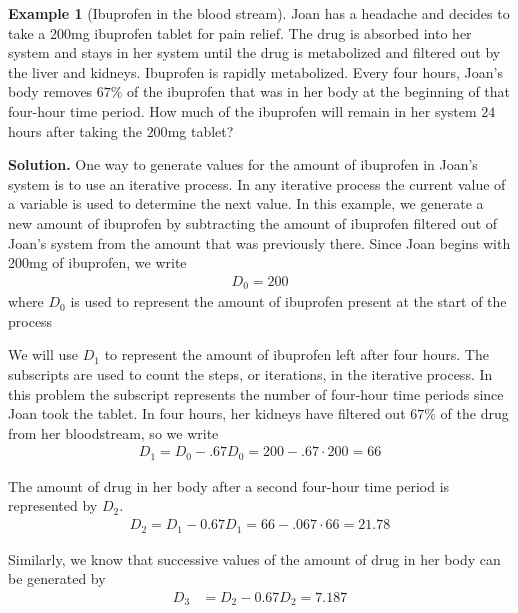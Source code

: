 \documentclass[10pt,]{book}
\theoremstyle{plain}
\theoremstyle{definition}
\theoremstyle{definition}
\newtheorem{example}[theorem]{Example}
\theoremstyle{definition}
\numberwithin{equation}{section}
\newcommand{\amp}{&}
\begin{document}
\begin{example}[Ibuprofen in the blood stream]\label{ibuprofen-example-one-dose}
\hypertarget{p-6}{}%
Joan has a headache and decides to take a 200mg ibuprofen tablet for pain relief.  The drug is absorbed into her system and stays in her system until the drug is metabolized and filtered out by the liver and kidneys.  Ibuprofen is rapidly metabolized.  Every four hours, Joan's body removes \(67\%\) of the ibuprofen that was in her body at the beginning of that four-hour time period.  How much of the ibuprofen will remain in her system \(24\) hours after taking the \(200\)mg tablet?%
\par\smallskip%
\noindent\textbf{Solution.}\hypertarget{solution-1}{}\quad%
\hypertarget{p-7}{}%
One way to generate values for the amount of ibuprofen in Joan's system is to use an iterative process.  In any iterative process the current value of a variable is used to determine the next value.  In this example, we generate a new amount of ibuprofen by subtracting the amount of ibuprofen filtered out of Joan's system from the amount that was previously there.  Since Joan begins with 200mg of ibuprofen, we write%
\begin{gather*}
D_0 = 200
\end{gather*}
where \(D_0\) is used to represent the amount of ibuprofen present at the start of the process%
\par
\hypertarget{p-8}{}%
We will use \(D_1\) to represent the amount of ibuprofen left after four hours.  The subscripts are used to count the steps, or iterations,  in the iterative process. In this problem the subscript  represents the number of four-hour time periods since Joan took the tablet.  In four hours, her kidneys have filtered out \(67\%\) of the drug from her bloodstream, so we write%
\begin{gather*}
D_1=D_0-.67D_0=200-.67 \cdot 200 = 66
\end{gather*}
%
\par
\hypertarget{p-9}{}%
The amount of drug in her body after a second four-hour time period is represented by \(D_2\).%
\begin{gather*}
D_2=D_1-0.67D_1=66-.067 \cdot 66 = 21.78
\end{gather*}
%
\par
\hypertarget{p-10}{}%
Similarly, we know that successive values of the amount of drug in her body can be generated by%
\begin{align*}
D_3 \amp = D_2-0.67D_2 = 7.187\\

\end{align*}
\end{example}
\end{document}
